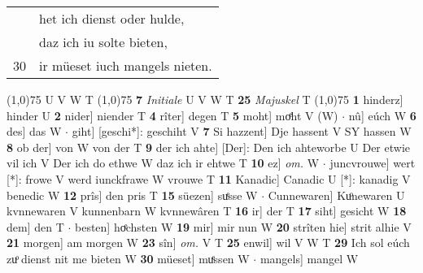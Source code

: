 \documentclass[8pt,a4paper,notitlepage]{article}
\begin{document}
\begin{table}[ht]
\begin{minipage}[t]{0.5\linewidth}
\begin{tabular}{rl}
 & het ich dienst oder hulde,\\ 
 & daz ich iu solte bieten,\\ 
30 & ir müeset iuch mangels nieten.\\ 
\end{tabular}
\scriptsize
\line(1,0){75} \newline
U V W T \newline
\line(1,0){75} \newline
\textbf{7} \textit{Initiale} U V W T  \textbf{25} \textit{Majuskel} T  \newline
\line(1,0){75} \newline
\textbf{1} hinderz] hinder U \textbf{2} nider] niender T \textbf{4} rîter] degen T \textbf{5} moht] moͤht V (W)  $\cdot$ nû] eúch W \textbf{6} des] das W  $\cdot$ giht] [geschi*]: geschiht V \textbf{7} Si hazzent] Dje hassent V SY hassen W \textbf{8} ob der] von W von der T \textbf{9} der ich ahte] [Der]: Den ich ahteworbe U Der etwie vil ich V Der ich do ethwe W daz ich ir ehtwe T \textbf{10} ez] \textit{om.} W  $\cdot$ juncvrouwe] wert [*]: frowe V werd iunckfrawe W vrouwe T \textbf{11} Kanadic] Canadic U [*]: kanadig V benedic W \textbf{12} prîs] den pris T \textbf{15} süezen] suͤsse W  $\cdot$ Cunnewaren] Kuͦnewaren U kvnnewaren V kunnenbarn W kvnnewâren T \textbf{16} ir] der T \textbf{17} siht] gesicht W \textbf{18} dem] den T  $\cdot$ besten] hoͤchsten W \textbf{19} mir] mir nun W \textbf{20} strîten hie] strit alhie V \textbf{21} morgen] am morgen W \textbf{23} sîn] \textit{om.} V T \textbf{25} enwil] wil V W T \textbf{29} Ich sol eúch zuͦ dienst nit me bieten W \textbf{30} müeset] muͤssen W  $\cdot$ mangels] mangel W \newline
\end{minipage}
\end{table}
\end{document}
